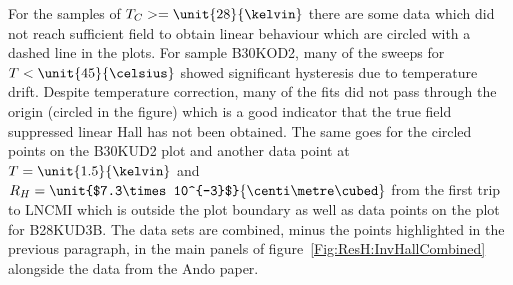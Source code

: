 For the samples of $T_C >= \unit{28}{\kelvin}$ there are some data which did not reach sufficient field to obtain linear behaviour which are circled with a dashed line in the plots. For sample B30KOD2, many of the sweeps for $T < \unit{45}{\celsius}$ showed significant hysteresis due to temperature drift. Despite temperature correction, many of the fits did not pass through the origin (circled in the figure) which is a good indicator that the true field suppressed linear Hall has not been obtained. The same goes for the circled points on the B30KUD2 plot and another data point at $T=\unit{1.5}{\kelvin}$ and $R_H = \unit{$7.3\times10^{-3}$}{\centi\metre\cubed}$ from the first trip to \ac{LNCMI} which is outside the plot boundary as well as data points on the plot for B28KUD3B. The data sets are combined, minus the points highlighted in the previous paragraph, in the main panels of figure~\ref{Fig:ResH:InvHallCombined} alongside the data from the Ando paper.

